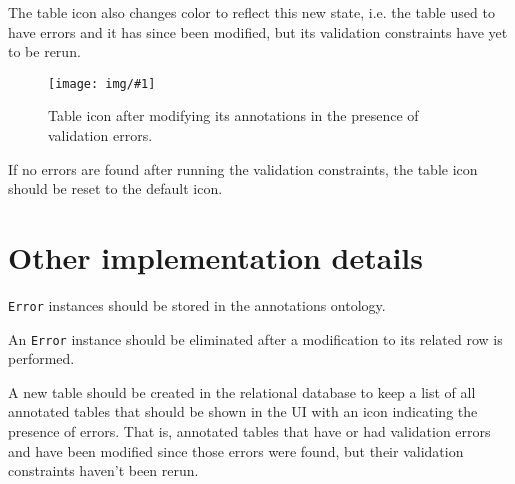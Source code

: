 \documentclass[a4paper, 10pt]{article}
\newcommand{\code}[1]{\texttt{#1}}
\newcommand{\img}[3]{
  \begin{figure}[H]
    \begin{center}
      \texttt{[image: img/\#1]}
      \caption{#2}
    \end{center}
  \end{figure}
}
\begin{document}
The table icon also changes color to reflect this new state, i.e. the table
used to have errors and it has since been modified, but its validation
constraints have yet to be rerun.

\img{table-pin-after-modifications.png}{
  Table icon after modifying its annotations in the presence of validation
  errors.
}{5cm}

If no errors are found after running the validation constraints, the table icon
should be reset to the default icon.


\section{Other implementation details}

\code{Error} instances should be stored in the annotations ontology.

An \code{Error} instance should be eliminated after a modification to its
related row is performed.

A new table should be created in the relational database to keep a list of all
annotated tables that should be shown in the UI with an icon indicating the
presence of errors. That is, annotated tables that have or had validation
errors and have been modified since those errors were found, but their
validation constraints haven't been rerun.
\end{document}
